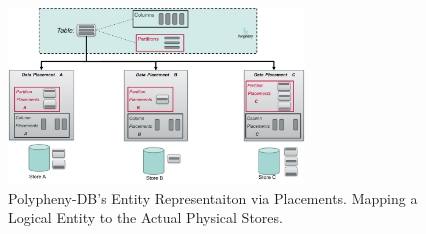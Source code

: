 \begin{figure}[t]
    \centering
    \includegraphics[width=0.7\textwidth]{Figures/data_placement.png}
    \caption{Polypheny-DB's Entity Representaiton via Placements. Mapping a Logical Entity to the Actual Physical Stores.}
    \label{fig:placements}
\end{figure}

